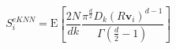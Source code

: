 \begin{equation}
\label{eq:ad_knn_e}
S_i^{eKNN} = \text{E}\left[\frac{2N}{dk}\frac{\pi^{\frac{d}{2}}D_{k}(R\bm{v}_i)^{d-1}}{\Gamma\left(\frac{d}{2} - 1\right)}\right]
\end{equation}
